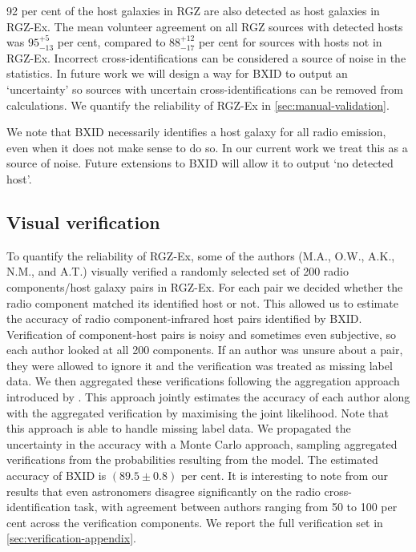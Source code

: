 92 per cent of the host galaxies in RGZ are also detected as host galaxies in RGZ-Ex. The mean volunteer agreement on all RGZ sources with detected hosts was $95^{+5}_{-13}$ per cent, compared to $88^{+12}_{-17}$ per cent for sources with hosts not in RGZ-Ex. Incorrect cross-identifications can be considered a source of noise in the statistics. In future work we will design a way for BXID to output an `uncertainty' so sources with uncertain cross-identifications can be removed from calculations. We quantify the reliability of RGZ-Ex in \autoref{sec:manual-validation}.

We note that BXID necessarily identifies a host galaxy for all radio emission, even when it does not
make sense to do so. In our current work we treat this as a source of
noise. Future extensions to BXID will allow it to output `no detected
host'.

    \subsection{Visual verification}\label{sec:manual-validation}

    To quantify the reliability of RGZ-Ex, some of the authors (M.A., O.W., A.K., N.M., and A.T.) visually verified a randomly selected set of 200 radio components/host galaxy pairs in RGZ-Ex. For each pair we decided whether the radio component matched its identified host or not. This allowed us to estimate the accuracy of radio component-infrared host pairs identified by BXID. Verification of component-host pairs is noisy and sometimes even subjective, so each author looked at all 200 components. If an author was unsure about a pair, they were allowed to ignore it and the verification was treated as missing label data. We then aggregated these verifications following the aggregation approach introduced by \citet{dawid79em}. This approach jointly estimates the accuracy of each author along with the aggregated verification by maximising the joint likelihood. Note that this approach is able to handle missing label data. We propagated the uncertainty in the accuracy with a Monte Carlo approach, sampling aggregated verifications from the probabilities resulting from the \citeauthor{dawid79em} model. The estimated accuracy of BXID is $(89.5 \pm 0.8)$ per cent. It is interesting to note from our results that even astronomers disagree significantly on the radio cross-identification task, with agreement between authors ranging from 50 to 100 per cent across the verification components. We report the full verification set in \autoref{sec:verification-appendix}.

